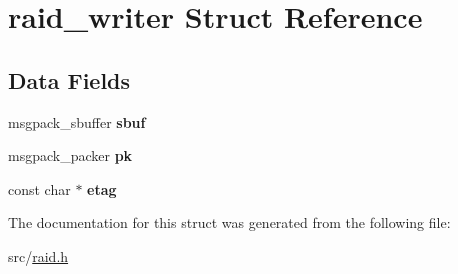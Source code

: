 \hypertarget{structraid__writer}{}\section{raid\+\_\+writer Struct Reference}
\label{structraid__writer}
\subsection*{Data Fields}
\begin{DoxyCompactItemize}
\item 
msgpack\+\_\+sbuffer {\bfseries sbuf}\hypertarget{structraid__writer_a625213797a0ccc63f13d3d7d7474491e}{}\label{structraid__writer_a625213797a0ccc63f13d3d7d7474491e}

\item 
msgpack\+\_\+packer {\bfseries pk}\hypertarget{structraid__writer_a3e2732058445deeeb8b665937b2768e8}{}\label{structraid__writer_a3e2732058445deeeb8b665937b2768e8}

\item 
const char $\ast$ {\bfseries etag}\hypertarget{structraid__writer_a555b07c6d9215e5687f886c5ab330734}{}\label{structraid__writer_a555b07c6d9215e5687f886c5ab330734}

\end{DoxyCompactItemize}


The documentation for this struct was generated from the following file\+:\begin{DoxyCompactItemize}
\item 
src/\hyperlink{raid_8h}{raid.\+h}\end{DoxyCompactItemize}
